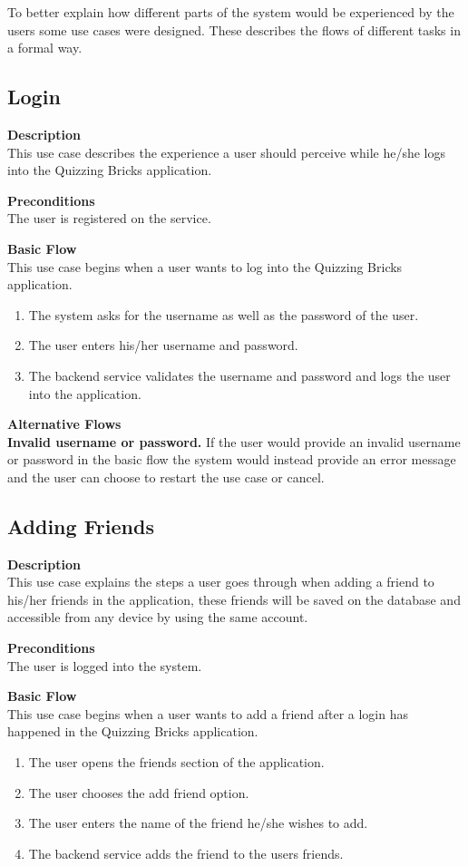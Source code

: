 To better explain how different parts of the system would be experienced by the users some use cases were designed. These describes the flows of different tasks in a formal way.

\subsection{Login}

\textbf{Description}\\
This use case describes the experience a user should perceive while he/she logs into the Quizzing Bricks application.

\textbf{Preconditions}\\
The user is registered on the service.

\textbf{Basic Flow}\\
This use case begins when a user wants to log into the Quizzing Bricks application.
\begin{enumerate}
	\item The system asks for the username as well as the password of the user.
	\item The user enters his/her username and password.
	\item The backend service validates the username and password and logs the user into the application.
\end{enumerate}

\bigskip\textbf{Alternative Flows}\\[1\baselineskip]
\textbf{Invalid username or password.}
If the user would provide an invalid username or password in the basic flow the system would instead provide an error message and the user can choose to restart the use case or cancel.


\subsection{Adding Friends}

\textbf{Description}\\
This use case explains the steps a user goes through when adding a friend to his/her friends in the application, these friends will be saved on the database and accessible from any device by using the same account.

\textbf{Preconditions}\\
The user is logged into the system.

\textbf{Basic Flow}\\
This use case begins  when a user wants to add a friend after a login has happened in the Quizzing Bricks application.
\begin{enumerate}
	\item The user opens the friends section of the application.
	\item The user chooses the add friend option.
	\item The user enters the name of the friend he/she wishes to add.
	\item The backend service adds the friend to the users friends.
\end{enumerate}

